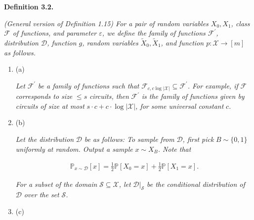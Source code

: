 \documentclass[10pt,a4paper]{article}
\begin{document}


\par\medskip\noindent\textbf{
\textbf{Definition 3.2}\textbf{.}
}\par



\emph{(General version of Definition 1.15)
For a pair of random variables $X_{0},X_{1}$, class $\mathcal{F}$ of functions, and parameter $\varepsilon$,
we define the family of functions $\mathcal{F}^{\prime}$, distribution $\mathcal{D}$, function $g$, random variables $\widetilde{X}_{0},\widetilde{X}_{1}$, and function $p:\mathcal{X}\to[m]$ as follows.}\par


\begin{enumerate}


\item[] 
(a) 


\emph{Let }$\mathcal{F}^{\prime}$\emph{ be a family of functions such that }$\mathcal{F}_{c,c\log|\mathcal{X}|}\subseteq\mathcal{F}^{\prime}$\emph{. For example, if }$\mathcal{F}$\emph{ corresponds to size }$\leq s$\emph{ circuits, then }$\mathcal{F}^{\prime}$\emph{ is the family of functions given by circuits of size at most }$s\cdot c+c\cdot\log|\mathcal{X}|$\emph{, for some universal constant }$c$\emph{.}\par





\item[] 
(b) 


\emph{Let the distribution }$\mathcal{D}$\emph{ be as follows: To sample from }$\mathcal{D}$\emph{, first pick }$B\sim\{0,1\}$\emph{ uniformly at random. Output a sample }$x\sim X_{B}$\emph{. Note that}\par


\[\begin{gathered}
\mathbb{P}_{x\sim\mathcal{D}}[x]=\frac{1}{2}\mathbb{P}[X_{0}=x]+\frac{1}{2}\mathbb{P}[X_{1}=x].
\end{gathered}\]




\emph{For a subset of the domain }$\mathcal{S}\subseteq\mathcal{X}$\emph{, let }$\mathcal{D}|_{\mathcal{S}}$\emph{ be the conditional distribution of }$\mathcal{D}$\emph{ over the set }$\mathcal{S}$\emph{.}\par





\item[] 
(c) 



\end{enumerate}
\end{document}
